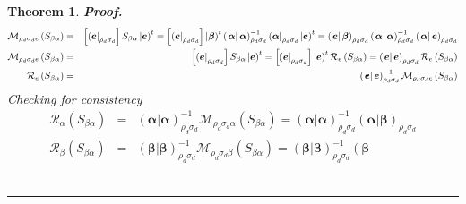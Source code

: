 \documentclass[aps,preprint]{revtex4}
\newtheorem{theorem}{Theorem}
\newenvironment{proof}[1][Proof]{\noindent\textbf{#1.} }{\ \rule{0.5em}{0.5em}}
\begin{document}
\begin{enumerate}
\begin{enumerate}
\begin{theorem}
\begin{proof}
\begin{eqnarray}
\mathcal{M}_{\rho _{d}\sigma _{d}e}\left( S_{\beta \alpha }\right) &=&\left[ 
\overset{}{\left( \boldsymbol{e}\right\vert _{\rho _{d}\sigma _{d}}}\right]
S_{\beta \alpha }\left\vert \overset{}{\boldsymbol{e}}\right) ^{t}=\left[ 
\overset{}{\left( \boldsymbol{e}\right\vert _{\rho _{d}\sigma _{d}}}\right]
\left\vert \boldsymbol{\beta }\right) ^{t}\left( \left. \boldsymbol{\alpha }%
\right\vert \boldsymbol{\alpha }\right) _{\rho _{d}\sigma _{d}}^{-1}\left( 
\boldsymbol{\alpha }\right\vert _{\rho _{d}\sigma _{d}}\left\vert \overset{}{%
\boldsymbol{e}}\right) ^{t}=\left( \left. \boldsymbol{e}\right\vert 
\boldsymbol{\beta }\right) _{\rho _{d}\sigma _{d}}\left( \left. \boldsymbol{%
\alpha }\right\vert \boldsymbol{\alpha }\right) _{\rho _{d}\sigma
_{d}}^{-1}\left( \left. \boldsymbol{\alpha }\right\vert \boldsymbol{e}%
\right) _{\rho _{d}\sigma _{d}} \\
\mathcal{M}_{\rho _{d}\sigma _{d}e}\left( S_{\beta \alpha }\right) &=&\left[ 
\overset{}{\left( \boldsymbol{e}\right\vert _{\rho _{d}\sigma _{d}}}\right]
S_{\beta \alpha }\left\vert \overset{}{\boldsymbol{e}}\right) ^{t}=\left[ 
\overset{}{\left( \boldsymbol{e}\right\vert _{\rho _{d}\sigma _{d}}}\right]
\left\vert \boldsymbol{e}\right) ^{t}\mathcal{R}_{e}\left( S_{\beta \alpha
}\right) =\left( \left. \boldsymbol{e}\right\vert \boldsymbol{e}\right)
_{\rho _{d}\sigma _{d}}\mathcal{R}_{e}\left( S_{\beta \alpha }\right) \\
\mathcal{R}_{e}\left( S_{\beta \alpha }\right) &=&\left( \left. \boldsymbol{e%
}\right\vert \boldsymbol{e}\right) _{\rho _{d}\sigma _{d}}^{-1}\mathcal{M}%
_{\rho _{d}\sigma _{d}e}\left( S_{\beta \alpha }\right)
\end{eqnarray}%
Checking for consistency 
\begin{eqnarray}
\mathcal{R}_{\alpha }\left( S_{\beta \alpha }\right) &=&\left( \left. 
\boldsymbol{\alpha }\right\vert \boldsymbol{\alpha }\right) _{\rho
_{d}\sigma _{d}}^{-1}\mathcal{M}_{\rho _{d}\sigma _{d}\alpha }\left(
S_{\beta \alpha }\right) =\left( \left. \boldsymbol{\alpha }\right\vert 
\boldsymbol{\alpha }\right) _{\rho _{d}\sigma _{d}}^{-1}\left( \left. 
\boldsymbol{\alpha }\right\vert \boldsymbol{\beta }\right) _{\rho _{d}\sigma
_{d}} \\
\mathcal{R}_{\beta }\left( S_{\beta \alpha }\right) &=&\left( \left. 
\boldsymbol{\beta }\right\vert \boldsymbol{\beta }\right) _{\rho _{d}\sigma
_{d}}^{-1}\mathcal{M}_{\rho _{d}\sigma _{d}\beta }\left( S_{\beta \alpha
}\right) =\left( \left. \boldsymbol{\beta }\right\vert \boldsymbol{\beta }%
\right) _{\rho _{d}\sigma _{d}}^{-1}\left( \left. \boldsymbol{\beta }%

\end{eqnarray}
\end{proof}
\end{theorem}
\end{enumerate}
\end{enumerate}
\end{document}
